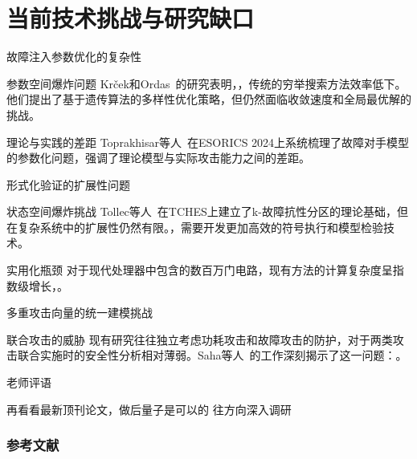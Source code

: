 \documentclass{beamer}
\begin{document}
\section{当前技术挑战与研究缺口}
\begin{frame}{故障注入参数优化的复杂性}
  \begin{block}{参数空间爆炸问题}
    Krček和Ordas~\cite{ESORICS:KrcOrd24}的研究表明，，传统的穷举搜索方法效率低下。他们提出了基于遗传算法的多样性优化策略，但仍然面临收敛速度和全局最优解的挑战。
  \end{block}
  
  \begin{block}{理论与实践的差距}
    Toprakhisar等人~\cite{ESORICS:TopNikNik24}在ESORICS 2024上系统梳理了故障对手模型的参数化问题，强调了理论模型与实际攻击能力之间的差距。
  \end{block}
\end{frame}

\begin{frame}{形式化验证的扩展性问题}
  \begin{block}{状态空间爆炸挑战}
    Tollec等人~\cite{TCHES:THNABC24}在TCHES上建立了k-故障抗性分区的理论基础，但在复杂系统中的扩展性仍然有限。，需要开发更加高效的符号执行和模型检验技术。
  \end{block}
  
  \begin{block}{实用化瓶颈}
    对于现代处理器中包含的数百万门电路，现有方法的计算复杂度呈指数级增长，。
  \end{block}
\end{frame}

\begin{frame}{多重攻击向量的统一建模挑战}
  \begin{block}{联合攻击的威胁}
    现有研究往往独立考虑功耗攻击和故障攻击的防护，对于两类攻击联合实施时的安全性分析相对薄弱。Saha等人~\cite{COSADE:SahBagJapMuk21}的工作深刻揭示了这一问题：。
  \end{block}
\end{frame}


\begin{frame}{老师评语}
    \begin{alertblock}{再看看最新顶刊论文，做后量子是可以的}
      往方向深入调研
    \end{alertblock}
\end{frame}

\begin{frame}[allowframebreaks]
  \frametitle{参考文献}
  
  
\end{frame}
\end{document}
